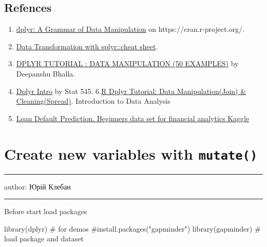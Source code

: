 \documentclass[
  letterpaper,
  DIV=11,
  numbers=noendperiod]{scrreprt}
\newenvironment{Shaded}{\begin{snugshade}}{\end{snugshade}}
\newcommand{\CommentTok}[1]{\textcolor[rgb]{0.37,0.37,0.37}{#1}}
\newcommand{\FunctionTok}[1]{\textcolor[rgb]{0.28,0.35,0.67}{#1}}
\newcommand{\NormalTok}[1]{\textcolor[rgb]{0.00,0.23,0.31}{#1}}
\providecommand{\tightlist}{%
  \setlength{\itemsep}{0pt}\setlength{\parskip}{0pt}}\usepackage{longtable,booktabs,array}
\begin{document}
\section{Refences}\label{refences-3}

\begin{enumerate}
\def\labelenumi{\arabic{enumi}.}
\tightlist
\item
  \href{https://cran.r-project.org/web/packages/dplyr/index.html}{dplyr:
  A Grammar of Data Manipulation} on https://cran.r-project.org/.
\item
  \href{https://github.com/rstudio/cheatsheets/blob/master/data-transformation.pdf}{Data
  Transformation with splyr::cheat sheet}.
\item
  \href{https://www.listendata.com/2016/08/dplyr-tutorial.html}{DPLYR
  TUTORIAL : DATA MANIPULATION (50 EXAMPLES)} by Deepanshu Bhalla.
\item
  \href{https://stat545.com/dplyr-intro.html}{Dplyr Intro} by Stat 545.
  6.\href{https://www.guru99.com/r-dplyr-tutorial.html}{R Dplyr
  Tutorial: Data Manipulation(Join) \& Cleaning(Spread)}. Introduction
  to Data Analysis
\item
  \href{https://www.kaggle.com/kmldas/loan-default-prediction}{Loan
  Default Prediction. Beginners data set for financial analytics Kaggle}
\end{enumerate}

\chapter{\texorpdfstring{Create new variables with
\textbf{\texttt{mutate()}}}{Create new variables with mutate()}}\label{create-new-variables-with-mutate}

\begin{center}\rule{0.5\linewidth}{0.5pt}\end{center}

author: Юрій Клебан

\begin{center}\rule{0.5\linewidth}{0.5pt}\end{center}

Before start load packages

\begin{Shaded}
\begin{Highlighting}[]
\FunctionTok{library}\NormalTok{(dplyr) }\CommentTok{\# for demos}
\CommentTok{\#install.packages("gapminder")}
\FunctionTok{library}\NormalTok{(gapminder)  }\CommentTok{\# load package and dataset}
\end{Highlighting}
\end{Shaded}
\end{document}

